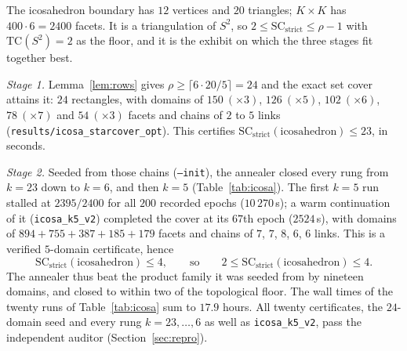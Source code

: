 \documentclass[12pt]{article}
\newcommand{\TC}{\mathrm{TC}}
\newcommand{\SC}{\mathrm{SC}}
\newcommand{\SCst}{\SC_{\mathrm{strict}}}
\begin{document}
The icosahedron boundary has $12$ vertices and $20$ triangles; $K\times K$
has $400\cdot6=2400$ facets.  It is a triangulation of $S^2$, so
$2\le\SCst\le\rho-1$ with $\TC(S^2)=2$ as the floor, and it is the
exhibit on which the three stages fit together best.

\emph{Stage 1.}  Lemma~\ref{lem:rows} gives $\rho\ge\lceil6\cdot20/5\rceil=24$
and the exact set cover attains it: $24$ rectangles, with domains of
$150\ (\times3)$, $126\ (\times5)$, $102\ (\times6)$, $78\ (\times7)$ and
$54\ (\times3)$ facets and chains of $2$ to $5$ links
(\texttt{results/icosa\_starcover\_opt}).  This certifies
$\SCst(\text{icosahedron})\le23$, in seconds.

\emph{Stage 2.}  Seeded from those chains (\texttt{--init}), the
annealer closed every rung from $k=23$ down to $k=6$, and then $k=5$
(Table~\ref{tab:icosa}).  The first $k=5$ run stalled at $2395/2400$
for all $200$ recorded epochs ($10\,270$\,s); a warm continuation of it
(\texttt{icosa\_k5\_v2}) completed the cover at its $67$th epoch
($2524$\,s), with domains of $894+755+387+185+179$ facets and chains of
$7$, $7$, $8$, $6$, $6$ links.  This is a verified $5$-domain
certificate, hence
\[
\SCst(\text{icosahedron})\le4,\qquad\text{so}\qquad 2\le\SCst(\text{icosahedron})\le4 .
\]
The annealer thus beat the product family it was seeded from by nineteen
domains, and closed to within two of the topological floor.  The wall
times of the twenty runs of Table~\ref{tab:icosa} sum to $17.9$ hours.
All twenty certificates, the $24$-domain seed and every rung $k=23,\dots,6$
as well as \texttt{icosa\_k5\_v2}, pass the independent auditor
(Section~\ref{sec:repro}).
\end{document}
